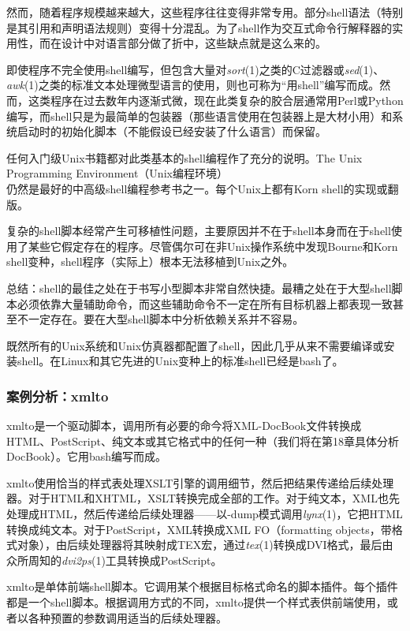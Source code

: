 \documentclass[12pt,oneside]{book}
\begin{document}
然而，随着程序规模越来越大，这些程序往往变得非常专用。部分shell语法（特别是其引用和声明语法规则）变得十分混乱。为了shell作为交互式命令行解释器的实用性，而在设计中对语言部分做了折中，这些缺点就是这么来的。

即使程序不完全使用shell编写，但包含大量对\textit{sort}(1)之类的C过滤器或\textit{sed}(1)、\textit{awk}(1)之类的标准文本处理微型语言的使用，则也可称为“用shell”编写而成。然而，这类程序在过去数年内逐渐式微，现在此类复杂的胶合层通常用Perl或Python编写，而shell只是为最简单的包装器（那些语言使用在包装器上是大材小用）和系统启动时的初始化脚本（不能假设已经安装了什么语言）而保留。

任何入门级Unix书籍都对此类基本的shell编程作了充分的说明。The Unix Programming Environment（Unix编程环境）\\ \cite{Kernighan-Pike84}仍然是最好的中高级shell编程参考书之一。每个Unix上都有Korn shell的实现或翻版。

复杂的shell脚本经常产生可移植性问题，主要原因并不在于shell本身而在于shell使用了某些它假定存在的程序。尽管偶尔可在非Unix操作系统中发现Bourne和Korn shell变种，shell程序（实际上）根本无法移植到Unix之外。

总结：shell的最佳之处在于书写小型脚本非常自然快捷。最糟之处在于大型shell脚本必须依靠大量辅助命令，而这些辅助命令不一定在所有目标机器上都表现一致甚至不一定存在。要在大型shell脚本中分析依赖关系并不容易。

既然所有的Unix系统和Unix仿真器都配置了shell，因此几乎从来不需要编译或安装shell。在Linux和其它先进的Unix变种上的标准shell已经是bash了。

\subsubsection{案例分析：xmlto}
xmlto是一个驱动脚本，调用所有必要的命今将XML-DocBook文件转换成HTML、PostScript、纯文本或其它格式中的任何一种（我们将在第18章具体分析DocBook）。它用bash编写而成。

xmlto使用恰当的样式表处理XSLT引擎的调用细节，然后把结果传递给后续处理器。对于HTML和XHTML，XSLT转换完成全部的工作。对于纯文本，XML也先处理成HTML，然后传递给后续处理器——以-dump模式调用\textit{lynx}(1)，它把HTML转换成纯文本。对于PostScript，XML转换成XML FO（formatting objects，带格式对象），由后续处理器将其映射成TEX宏，通过\textit{tex}(1)转换成DVI格式，最后由众所周知的\textit{dvi2ps}(1)工具转换成PostScript。

xmlto是单体前端shell脚本。它调用某个根据目标格式命名的脚本插件。每个插件都是一个shell脚本。根据调用方式的不同，xmlto提供一个样式表供前端使用，或者以各种预置的参数调用适当的后续处理器。
\end{document}
